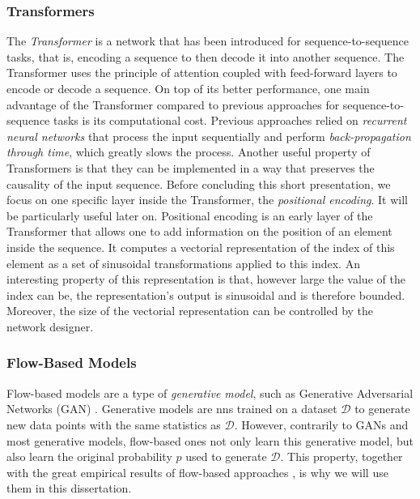 \subsubsection{Transformers}
\label{subsubsec:transformer}
The \emph{Transformer} \cite{vaswani2017attention} is a network that has been introduced for sequence-to-sequence tasks, that is, encoding a sequence to then decode it into another sequence. 
The Transformer uses the principle of attention \cite{bahdanau2014neural} coupled with feed-forward layers to encode or decode a sequence.
On top of its better performance, one main advantage of the Transformer compared to previous approaches for sequence-to-sequence tasks is its computational cost. 
Previous approaches relied on \emph{recurrent neural networks} that process the input sequentially and perform \emph{back-propagation through time}, which greatly slows the process.
Another useful property of Transformers is that they can be implemented in a way that preserves the causality of the input sequence.  
Before concluding this short presentation, we focus on one specific layer inside the Transformer, the \emph{positional encoding}.
It will be particularly useful later on.
Positional encoding is an early layer of the Transformer that allows one to add information on the position of an element inside the sequence.
It computes a vectorial representation of the index of this element as a set of sinusoidal transformations applied to this index. 
An interesting property of this representation is that, however large the value of the index can be, the representation's output is sinusoidal and is therefore bounded.
Moreover, the size of the vectorial representation can be controlled by the network designer.


\subsubsection{Flow-Based Models}
\label{subsubsec:maf}

Flow-based models are a type of \emph{generative model}, such as Generative Adversarial Networks (GAN) \cite{goodfellow2014generative}. Generative models are \glspl{nn} trained on a dataset $\mathcal{D}$ to generate new data points with the same statistics as $\mathcal{D}$.
However, contrarily to GANs and most generative models, flow-based ones not only learn this generative model, but also learn the original probability $p$ used to generate $\mathcal{D}$. 
This property, together with the great empirical results of flow-based approaches \cite{oord2016wavenet,kingma2018glow}, is why we will use them in this dissertation.

